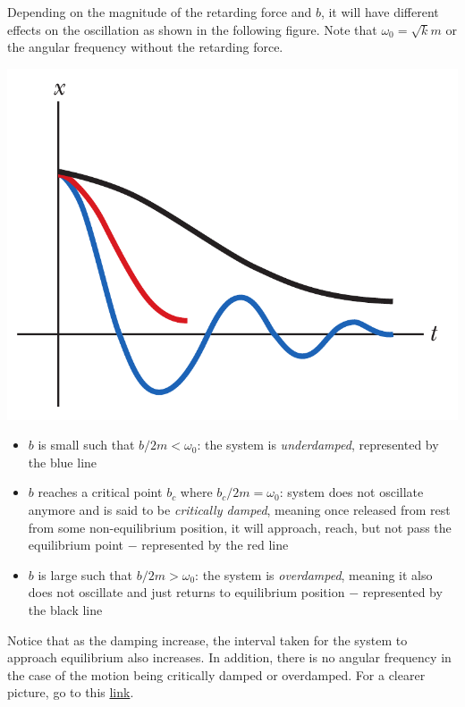 Depending on the magnitude of the retarding force and $b$, it will have different effects on the
oscillation as shown in the following figure. Note that $\omega_0 = \sqrt{k}{m}$ or the angular
frequency without the retarding force.
\begin{center}
    \includegraphics[scale=0.4]{images/oaw/damped02.png}
\end{center}
\begin{itemize}
    \item $b$ is small such that $b/2m < \omega_0$: the system is \textit{underdamped}, represented
        by the blue line
    \item $b$ reaches a critical point $b_c$ where $b_c/2m = \omega_0$: system does not 
        oscillate anymore and is said to be \textit{critically damped}, meaning once released from
        rest from some non-equilibrium position, it will approach, reach, but not pass the
        equilibrium point $-$ represented by the red line
    \item $b$ is large such that $b/2m > \omega_0$: the system is \textit{overdamped}, meaning it also
        does not oscillate and just returns to equilibrium position $-$ represented by the black line
\end{itemize}

Notice that as the damping increase, the interval taken for the system to approach equilibrium also increases.
In addition, there is no angular frequency in the case of the motion being critically damped or overdamped.
For a clearer picture, go to this \href{https://youtu.be/99ZE2RGwqSM}{link}.